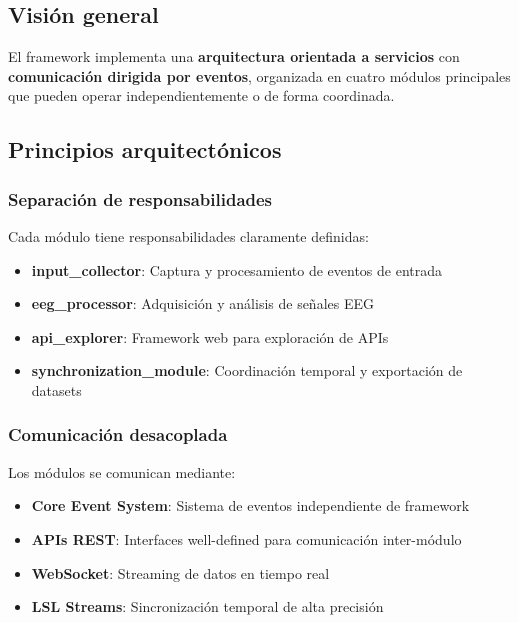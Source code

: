 \subsection{Visión general}
\label{subsec:vision_general}

El framework implementa una \textbf{arquitectura orientada a servicios} con \textbf{comunicación dirigida por eventos}, organizada en cuatro módulos principales que pueden operar independientemente o de forma coordinada.

\subsection{Principios arquitectónicos}
\label{subsec:principios_arquitectonicos}

\subsubsection{Separación de responsabilidades}
Cada módulo tiene responsabilidades claramente definidas:

\begin{itemize}
    \item \textbf{input\_collector}: Captura y procesamiento de eventos de entrada
    \item \textbf{eeg\_processor}: Adquisición y análisis de señales EEG
    \item \textbf{api\_explorer}: Framework web para exploración de APIs
    \item \textbf{synchronization\_module}: Coordinación temporal y exportación de datasets
\end{itemize}

\subsubsection{Comunicación desacoplada}
Los módulos se comunican mediante:

\begin{itemize}
    \item \textbf{Core Event System}: Sistema de eventos independiente de framework
    \item \textbf{APIs REST}: Interfaces well-defined para comunicación inter-módulo
    \item \textbf{WebSocket}: Streaming de datos en tiempo real
    \item \textbf{LSL Streams}: Sincronización temporal de alta precisión
\end{itemize}

